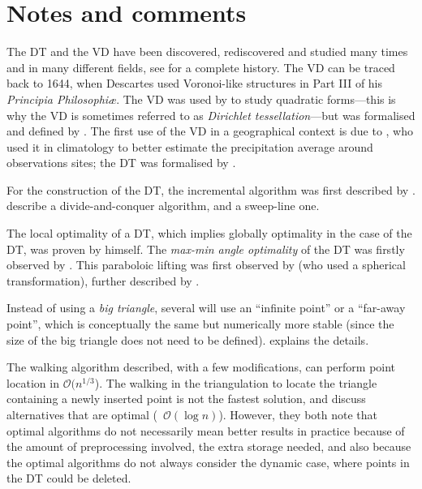 %
\section{Notes and comments}
\label{sec:notes}

The DT and the VD have been discovered, rediscovered and studied many times and in many different fields, see \citet{Okabe00} for a complete history.
The VD can be traced back to 1644, when Descartes used Voronoi-like structures in Part III of his \emph{Principia Philosophi\ae}. 
The VD was used by \citet{Dirichlet50} to study quadratic forms---this is why the VD is sometimes referred to as \emph{Dirichlet tessellation}---but was formalised and defined by \citet{Voronoi08}. 
The first use of the VD in a geographical context is due to \citet{Thiessen11}, who used it in climatology to better estimate the precipitation average around observations sites; the DT was formalised by \citet{Delaunay34}. 

For the construction of the DT, the incremental algorithm was first described by \citet{Lawson72-1}.
\citet{Guibas85} describe a divide-and-conquer algorithm, and \citet{Fortune87} a sweep-line one.

The local optimality of a DT, which implies globally optimality in the case of the DT, was proven by \citet{Delaunay34} himself.
The \emph{max-min angle optimality} of the DT was firstly observed by \citet{Sibson78}.
This paraboloic lifting was first observed by \citet{Brown79} (who used a spherical transformation), further described by \citet{Seidel82,Edelsbrunner86}. 

Instead of using a \emph{big triangle}, several will use an ``infinite point'' or a ``far-away point'', which is conceptually the same but numerically more stable (since the size of the big triangle does not need to be defined).
\citet{Liu05-1} explains the details.

The walking algorithm described, with a few modifications, can perform point location in $\mathcal{O}(n^{1/3}$).
The walking in the triangulation to locate the triangle containing a newly inserted point is not the fastest solution, \citet{Mucke99} and \citet{Devillers02} discuss alternatives that are optimal (\ie\ $\mathcal{O}(\log n)$).
However, they both note that optimal algorithms do not necessarily mean better results in practice because of the amount of preprocessing involved, the extra storage needed, and also because the optimal algorithms do not always consider the dynamic case, where points in the DT could be deleted. 


